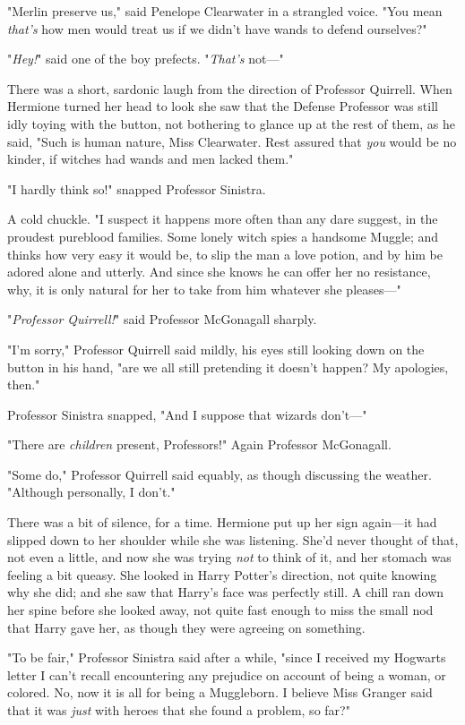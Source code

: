 "Merlin preserve us," said Penelope Clearwater in a strangled voice. "You mean 
\emph{that's} how men would treat us if we didn't have wands to defend 
ourselves?"

"\emph{Hey!}" said one of the boy prefects. "\emph{That's} not---"

There was a short, sardonic laugh from the direction of Professor Quirrell. 
When Hermione turned her head to look she saw that the Defense Professor was 
still idly toying with the button, not bothering to glance up at the rest of 
them, as he said, "Such is human nature, Miss Clearwater. Rest assured that 
\emph{you} would be no kinder, if witches had wands and men lacked them."

"I hardly think so!" snapped Professor Sinistra.

A cold chuckle. "I suspect it happens more often than any dare suggest, in the 
proudest pureblood families. Some lonely witch spies a handsome Muggle; and 
thinks how very easy it would be, to slip the man a love potion, and by him be 
adored alone and utterly. And since she knows he can offer her no resistance, 
why, it is only natural for her to take from him whatever she pleases---"

"\emph{Professor Quirrell!}" said Professor McGonagall sharply.

"I'm sorry," Professor Quirrell said mildly, his eyes still looking down on the 
button in his hand, "are we all still pretending it doesn't happen? My 
apologies, then."

Professor Sinistra snapped, "And I suppose that wizards don't---"

"There are \emph{children} present, Professors!" Again Professor McGonagall.

"Some do," Professor Quirrell said equably, as though discussing the weather. 
"Although personally, I don't."

There was a bit of silence, for a time. Hermione put up her sign again---it had 
slipped down to her shoulder while she was listening. She'd never thought of 
that, not even a little, and now she was trying \emph{not} to think of it, and 
her stomach was feeling a bit queasy. She looked in Harry Potter's direction, 
not quite knowing why she did; and she saw that Harry's face was perfectly 
still. A chill ran down her spine before she looked away, not quite fast enough 
to miss the small nod that Harry gave her, as though they were agreeing on 
something.

"To be fair," Professor Sinistra said after a while, "since I received my 
Hogwarts letter I can't recall encountering any prejudice on account of being a 
woman, or colored. No, now it is all for being a Muggleborn. I believe Miss 
Granger said that it was \emph{just} with heroes that she found a problem, so 
far?"

